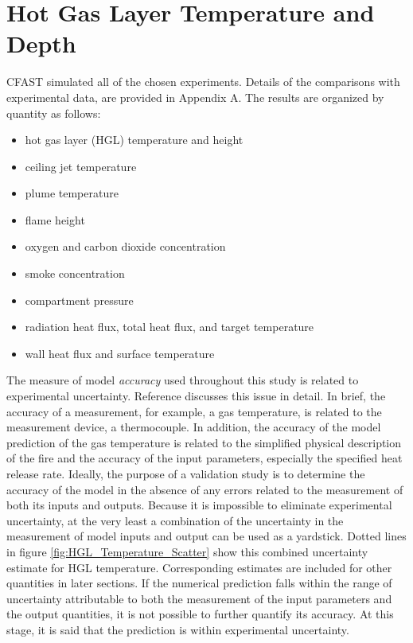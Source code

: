 \chapter{Hot Gas Layer Temperature and Depth}

CFAST simulated all of the chosen experiments.  Details of the comparisons with experimental data, are provided in Appendix A.  The results are organized by quantity as follows:

\begin{itemize}
\item hot gas layer (HGL) temperature and height
\item ceiling jet temperature
\item plume temperature 
\item flame height
\item oxygen and carbon dioxide concentration
\item smoke concentration
\item compartment pressure
\item radiation heat flux, total heat flux, and target temperature
\item wall heat flux and surface temperature
\end{itemize}

The measure of model \emph{accuracy} used throughout this study is related to experimental uncertainty. Reference \cite{NRCNUREG1824Experimental}  discusses this issue in detail. In brief, the accuracy of a measurement, for example, a gas temperature, is related to the measurement device, a thermocouple. In addition, the accuracy of the model prediction of the gas temperature is related to the simplified physical description of the fire and the accuracy of the input parameters, especially the specified heat release rate. Ideally, the purpose of a validation study is to determine the accuracy of the model in the absence of any errors related to the measurement of both its inputs and outputs. Because it is impossible to eliminate experimental uncertainty, at the very least a combination of the uncertainty in the measurement of model inputs and output can be used as a yardstick. Dotted lines in figure \ref{fig:HGL_Temperature_Scatter}  show this combined uncertainty estimate for HGL temperature. Corresponding estimates are included for other quantities in later sections. If the numerical prediction falls within the range of uncertainty attributable to both the measurement of the input parameters and the output quantities, it is not possible to further quantify its accuracy. At this stage, it is said that the prediction is within experimental uncertainty.

